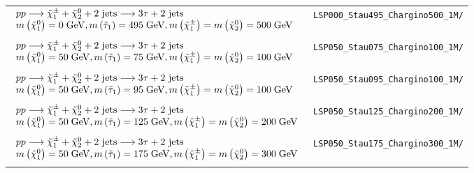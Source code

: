 \begin{table}[ht]
{\begin{tabular}{| l | l |}
			$\begin{array}{l}
			pp \longrightarrow \tilde{\chi}^{\pm}_{1} + \tilde{\chi}^{0}_{2} + 2\text{ jets} \longrightarrow 3\tau + 2\text{ jets} \\
			m\left(\tilde{\chi}^{0}_{1}\right) = 0\;\text{Ge}\kern-0.06667em\text{V}, 
			m\left(\tilde{\tau}_{1}\right) = 495\;\text{Ge}\kern-0.06667em\text{V},
			m\left(\tilde{\chi}^{\pm}_{1}\right)  = m\left(\tilde{\chi}^{0}_{2}\right) = 500\;\text{Ge}\kern-0.06667em\text{V} \\
			\end{array}$ & \texttt{LSP000\_Stau495\_Chargino500\_1M/}	\\
			&\\	

			$\begin{array}{l}
			pp \longrightarrow \tilde{\chi}^{\pm}_{1} + \tilde{\chi}^{0}_{2} + 2\text{ jets} \longrightarrow 3\tau + 2\text{ jets} \\
			m\left(\tilde{\chi}^{0}_{1}\right) = 50\;\text{Ge}\kern-0.06667em\text{V}, 
			m\left(\tilde{\tau}_{1}\right) = 75\;\text{Ge}\kern-0.06667em\text{V},
			m\left(\tilde{\chi}^{\pm}_{1}\right)  = m\left(\tilde{\chi}^{0}_{2}\right) = 100\;\text{Ge}\kern-0.06667em\text{V} \\
			\end{array}$ & \texttt{LSP050\_Stau075\_Chargino100\_1M/}	\\
			&\\	

			$\begin{array}{l}
			pp \longrightarrow \tilde{\chi}^{\pm}_{1} + \tilde{\chi}^{0}_{2} + 2\text{ jets} \longrightarrow 3\tau + 2\text{ jets} \\
			m\left(\tilde{\chi}^{0}_{1}\right) = 50\;\text{Ge}\kern-0.06667em\text{V}, 
			m\left(\tilde{\tau}_{1}\right) = 95\;\text{Ge}\kern-0.06667em\text{V},
			m\left(\tilde{\chi}^{\pm}_{1}\right)  = m\left(\tilde{\chi}^{0}_{2}\right) = 100\;\text{Ge}\kern-0.06667em\text{V} \\
			\end{array}$ & \texttt{LSP050\_Stau095\_Chargino100\_1M/}	\\
			&\\	

			$\begin{array}{l}
			pp \longrightarrow \tilde{\chi}^{\pm}_{1} + \tilde{\chi}^{0}_{2} + 2\text{ jets} \longrightarrow 3\tau + 2\text{ jets} \\
			m\left(\tilde{\chi}^{0}_{1}\right) = 50\;\text{Ge}\kern-0.06667em\text{V}, 
			m\left(\tilde{\tau}_{1}\right) = 125\;\text{Ge}\kern-0.06667em\text{V},
			m\left(\tilde{\chi}^{\pm}_{1}\right)  = m\left(\tilde{\chi}^{0}_{2}\right) = 200\;\text{Ge}\kern-0.06667em\text{V} \\
			\end{array}$ & \texttt{LSP050\_Stau125\_Chargino200\_1M/}	\\
			&\\	

			$\begin{array}{l}
			pp \longrightarrow \tilde{\chi}^{\pm}_{1} + \tilde{\chi}^{0}_{2} + 2\text{ jets} \longrightarrow 3\tau + 2\text{ jets} \\
			m\left(\tilde{\chi}^{0}_{1}\right) = 50\;\text{Ge}\kern-0.06667em\text{V}, 
			m\left(\tilde{\tau}_{1}\right) = 175\;\text{Ge}\kern-0.06667em\text{V},
			m\left(\tilde{\chi}^{\pm}_{1}\right)  = m\left(\tilde{\chi}^{0}_{2}\right) = 300\;\text{Ge}\kern-0.06667em\text{V} \\
			\end{array}$ & \texttt{LSP050\_Stau175\_Chargino300\_1M/}	\\
			&\\	


\end{tabular}}
\end{table}

